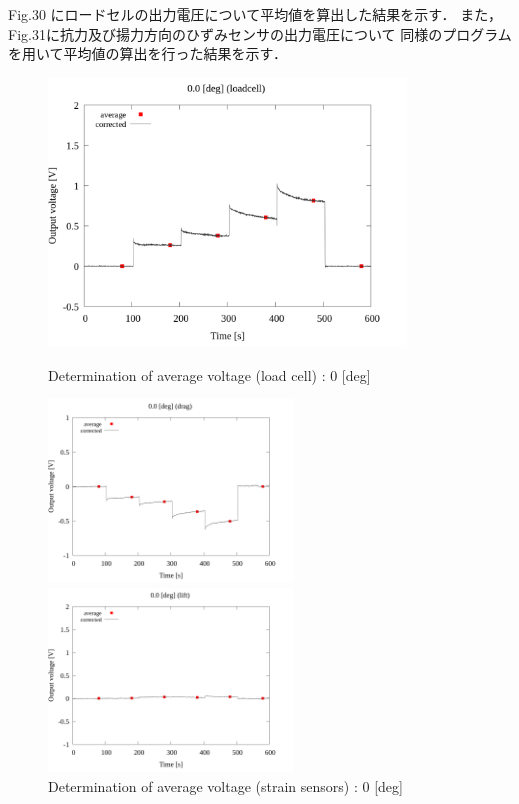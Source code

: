 Fig.30 にロードセルの出力電圧について平均値を算出した結果を示す．
また，Fig.31に抗力及び揚力方向のひずみセンサの出力電圧について
同様のプログラムを用いて平均値の算出を行った結果を示す．

\begin{figure}[htbp]
  \footnotesize
  \begin{center}
    \includegraphics[width=95mm]{../../02_workspace/result/2-1/plot/03-1_loadcell/03_loadcell_average_0.png}
    \caption{Determination of average voltage (load cell) : 0 [deg]}
  \end{center}
  \begin{minipage}[b]{0.45\linewidth}
    \centering
    \includegraphics[width=65mm]{../../02_workspace/result/2-1/plot/03-2_drag/03_drag_average_0.png}
  \end{minipage}
  \begin{minipage}[b]{0.45\linewidth}
    \centering
    \includegraphics[width=65mm]{../../02_workspace/result/2-1/plot/03-3_lift/03_lift_average_0.png}
  \end{minipage}
  \caption{Determination of average voltage (strain sensors) : 0 [deg]}
\end{figure}


